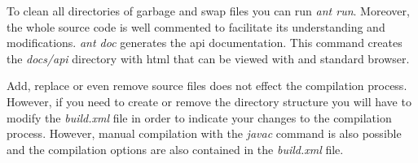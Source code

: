 \documentclass[a4paper,10pt]{article}
\begin{document}
	To clean all directories of garbage and swap files you can run
	\emph{ant run}. Moreover, the whole source code is well commented
	to facilitate its understanding and modifications. \emph{ant doc}
	generates the api documentation. This command creates the
	\emph{docs/api} directory with html that can be viewed with and
	standard browser. 

	Add, replace or even remove source files does not effect the
	compilation process. However, if you need to create or remove the
	directory structure you will have to modify the \emph{build.xml}
	file in order to indicate your changes to the compilation
	process. However, manual compilation with the \emph{javac} command
	is also possible and the compilation options are also contained in
	the \emph{build.xml} file. 
\end{document}
